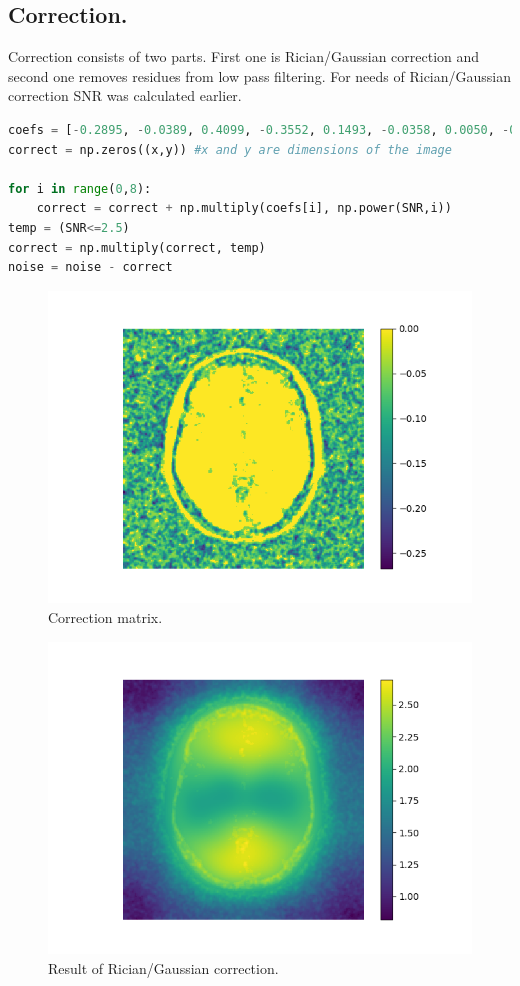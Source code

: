 \subsection*{Correction.}
Correction consists of two parts. First one is Rician/Gaussian correction and second one removes residues from low pass filtering. For needs of Rician/Gaussian correction SNR was calculated earlier.
\begin{lstlisting}[language=Python, caption = Rician/Gaussian correction.]
coefs = [-0.2895, -0.0389, 0.4099, -0.3552, 0.1493, -0.0358, 0.0050, -0.00037476, 0.000011802]
correct = np.zeros((x,y)) #x and y are dimensions of the image

for i in range(0,8):
    correct = correct + np.multiply(coefs[i], np.power(SNR,i))
temp = (SNR<=2.5)
correct = np.multiply(correct, temp)
noise = noise - correct
\end{lstlisting}
\begin{figure}[H]
	\centering{}
		\includegraphics[scale=0.7]{figures/module03/70_korekcja}
	\caption{Correction matrix.} 
\end{figure}
\begin{figure}[H]
	\centering{}
		\includegraphics[scale=0.7]{figures/module03/70_I_korekcja}
	\caption{Result of Rician/Gaussian correction.} 
\end{figure}
